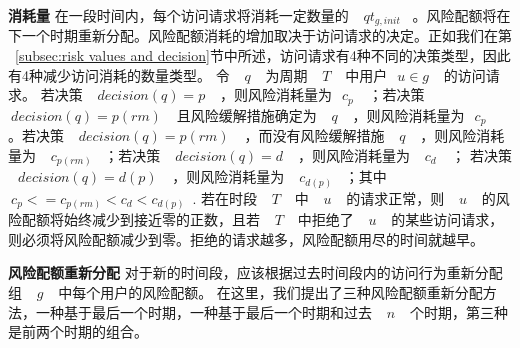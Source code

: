 \textbf{消耗量} 在一段时间内，每个访问请求将消耗一定数量的 ~$~qt_{g,init}$~ 。风险配额将在下一个时期重新分配。风险配额消耗的增加取决于访问请求的决定。正如我们在第 ~\ref{subsec:risk values and decision}节中所述，访问请求有4种不同的决策类型，因此有4种减少访问消耗的数量类型。 令 ~$~q~$~ 为周期 ~$~T~$~ 中用户~$~u \in g~$~ 的访问请求。 若决策 ~$~decision(q)=p~$~ ，则风险消耗量为~$~c_p~$~ ；若决策 ~$~decision(q)=p(rm)~$~ 且风险缓解措施确定为 ~$~q~$~ ，则风险消耗量为~$~c_p~$~ 。若决策 ~$~decision(q)=p(rm)~$~ ，而没有风险缓解措施 ~$~q~$~ ，则风险消耗量为 ~$~c_{p(rm)}$~ ；若决策 ~$~decision(q)=d~$~ ，则风险消耗量为 ~$~c_d~$~ ； 若决策 ~$~decision(q)=d(p)~$~ ，则风险消耗量为 ~$~c_{d(p)}$~ ；其中 ~$~c_p <= c_{p(rm)} < c_d < c_{d(p)}$~. 若在时段 ~$~T~$~ 中 ~$~u~$~ 的请求正常，则 ~$~u~$~ 的风险配额将始终减少到接近零的正数，且若 ~$~T~$~ 中拒绝了 ~$~u~$~ 的某些访问请求，则必须将风险配额减少到零。拒绝的请求越多，风险配额用尽的时间就越早。

\textbf{风险配额重新分配} 对于新的时间段，应该根据过去时间段内的访问行为重新分配组 ~$~g~$~ 中每个用户的风险配额。 在这里，我们提出了三种风险配额重新分配方法，一种基于最后一个时期，一种基于最后一个时期和过去 ~$~n~$~ 个时期，第三种是前两个时期的组合。

